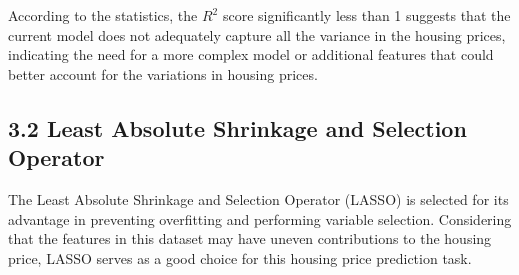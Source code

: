 \documentclass[12pt, letterpaper]{report}
\begin{document}
According to the statistics, the $R^2$ score significantly less than 1 suggests that the current model does not adequately capture all the variance in the housing prices, indicating the need for a more complex model or additional features that could better account for the variations in housing prices.

\subsection*{3.2  Least Absolute Shrinkage and Selection Operator}

The Least Absolute Shrinkage and Selection Operator (LASSO) is selected for its advantage in preventing overfitting and performing variable selection. Considering that the features in this dataset may have uneven contributions to the housing price, LASSO serves as a good choice for this housing price prediction task.



\end{document}
